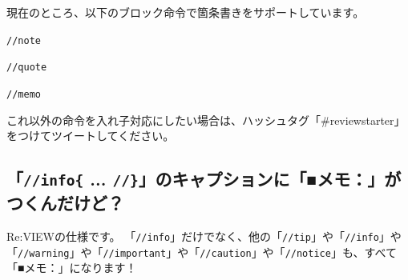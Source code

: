 現在のところ、以下のブロック命令で箇条書きをサポートしています。

\begin{starteritemize}
\item \texttt{//note}
\item \texttt{//quote}
\item \texttt{//memo}
\end{starteritemize}

これ以外の命令を入れ子対応にしたい場合は、ハッシュタグ「\#reviewstarter」をつけてツイートしてください。

\subsection*{「\texttt{//info\{} ... \texttt{//\}}」のキャプションに「■メモ：」がつくんだけど？}
\label{sec:2-3-3}
\label{subsec-faq-memo}

Re:VIEWの仕様です。
「\texttt{//info}」だけでなく、他の「\texttt{//tip}」や「\texttt{//info}」や「\texttt{//warning}」や「\texttt{//important}」や「\texttt{//caution}」や「\texttt{//notice}」も、すべて「■メモ：」になります！

\begin{starterprogram}\end{starterprogram}
\noindent
{}

\starterresult
\begin{reviewminicolumn}
\end{reviewminicolumn}
\endstarterresult
{}
\begin{starterprogram}\end{starterprogram}
\noindent
{}

\starterresult
\begin{reviewminicolumn}
\end{reviewminicolumn}
\endstarterresult
{}
\begin{starterprogram}\end{starterprogram}
\noindent
{}

\starterresult
\begin{reviewminicolumn}
\end{reviewminicolumn}
\endstarterresult
{}
\begin{starterprogram}\end{starterprogram}
\noindent
{}

